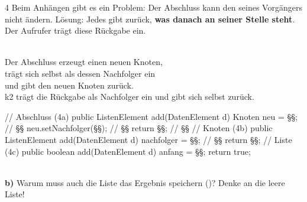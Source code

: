\documentclass[11pt,a4paper]{article}
\begin{document}
\newpage
\begin{aufgabe}{4}
Beim Anhängen gibt es ein Problem: Der Abschluss kann den  seines Vorgängers nicht ändern. Lösung: Jedes  gibt zurück, \textbf{was danach an seiner Stelle steht}. Der Aufrufer trägt diese Rückgabe ein.\\[1mm]
\begin{minipage}[t]{0.44\linewidth}
\vspace{0pt}
\\[1mm]
\scriptsize
{} Der Abschluss erzeugt einen neuen Knoten,\\
 trägt sich selbst als dessen Nachfolger ein\\
 und gibt den neuen Knoten zurück.\\
 k2 trägt die Rückgabe als Nachfolger ein und gibt sich selbst zurück.
\end{minipage}\hfill
\begin{minipage}[t]{0.54\linewidth}
\vspace{0pt}
\begin{java}[basicstyle=\ttfamily\scriptsize]
// Abschluss (4a)
public ListenElement add(DatenElement d) {
   Knoten neu = §§;     // §§
   neu.setNachfolger(§§);        // §§
   return §§;                     // §§
}
// Knoten (4b)
public ListenElement add(DatenElement d) {
   nachfolger = §§;  // §§
   return §§;
}
// Liste (4c)
public boolean add(DatenElement d) {
   anfang = §§;
   return true;
}
\end{java}
\end{minipage}\\[1mm]
\textbf{b)} Warum muss auch die Liste das Ergebnis speichern ()? Denke an die leere Liste!\\
\end{aufgabe}
\end{document}
